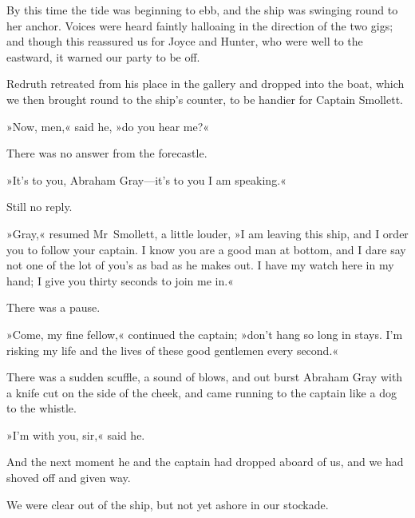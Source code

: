 By this time the tide was beginning to ebb, and the ship was swinging round to her anchor. Voices were heard faintly halloaing in the direction of the two gigs; and though this reassured us for Joyce and Hunter, who were well to the eastward, it warned our party to be off.

Redruth retreated from his place in the gallery and dropped into the boat, which we then brought round to the ship's counter, to be handier for Captain Smollett.

»Now, men,« said he, »do you hear me?«

There was no answer from the forecastle.

»It's to you, Abraham Gray—it's to you I am speaking.«

Still no reply.

»Gray,« resumed Mr~Smollett, a little louder, »I am leaving this ship, and I order you to follow your captain. I know you are a good man at bottom, and I dare say not one of the lot of you's as bad as he makes out. I have my watch here in my hand; I give you thirty seconds to join me in.«

There was a pause.

»Come, my fine fellow,« continued the captain; »don't hang so long in stays. I'm risking my life and the lives of these good gentlemen every second.«

There was a sudden scuffle, a sound of blows, and out burst Abraham Gray with a knife cut on the side of the cheek, and came running to the captain like a dog to the whistle.

»I'm with you, sir,« said he.

And the next moment he and the captain had dropped aboard of us, and we had shoved off and given way.

We were clear out of the ship, but not yet ashore in our stockade.